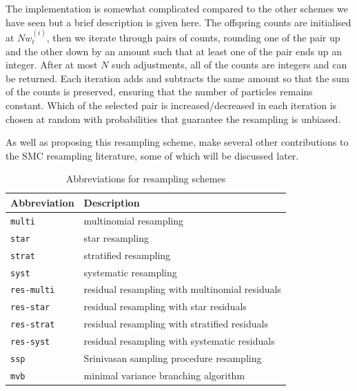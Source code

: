 The implementation is somewhat complicated compared to the other schemes we have seen \parencite[for full details see][Algorithm~1]{gerber2017} but a brief description is given here.
The offspring counts are initialised at $Nw_t^{(i)}$, then we iterate through pairs of counts, rounding one of the pair up and the other down by an amount such that at least one of the pair ends up an integer. After at most $N$ such adjustments, all of the counts are integers and can be returned. Each iteration adds and subtracts the same amount so that the sum of the counts is preserved, ensuring that the number of particles remains constant. Which of the selected pair is increased/decreased in each iteration is chosen at random with probabilities that guarantee the resampling is unbiased.

As well as proposing this resampling scheme, \textcite{gerber2017} make several other contributions to the SMC resampling literature, some of which will be discussed later.


\begin{table}[ht]
\centering
\begin{tabular}{ l l }
\hline\hline
Abbreviation & Description \\%
\hline
\texttt{multi} & multinomial resampling \\%
\texttt{star} & star resampling \\%
\texttt{strat} & stratified resampling \\%
\texttt{syst} & systematic resampling \\%
\texttt{res-multi} & residual resampling with multinomial residuals \\
\texttt{res-star} & residual resampling with star residuals \\
\texttt{res-strat} & residual resampling with stratified residuals \\
\texttt{res-syst} & residual resampling with systematic residuals \\
\texttt{ssp} & Srinivasan sampling procedure resampling \\%
\texttt{mvb} & minimal variance branching algorithm \\%
\hline\hline
\end{tabular}
\caption{Abbreviations for resampling schemes}
\label{tab:resampling_abbrevs}
\end{table} 





